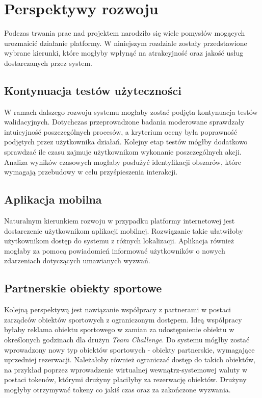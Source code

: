 \chapter{Perspektywy rozwoju}

Podczas trwania prac nad projektem narodziło się wiele pomysłów mogących urozmaicić działanie platformy. W niniejszym rozdziale zostały przedstawione wybrane kierunki, które mogłyby wpłynąć na atrakcyjność oraz jakość usług dostarczanych przez system.

\section{Kontynuacja testów użyteczności}

W ramach dalszego rozwoju systemu mogłaby zostać podjęta kontynuacja testów walidacyjnych. Dotychczas przeprowadzone badania moderowane sprawdzały intuicyjność poszczególnych procesów, a kryterium oceny była poprawność podjętych przez użytkownika działań. Kolejny etap testów mógłby dodatkowo sprawdzać ile czasu zajmuje użytkownikom wykonanie poszczególnych akcji. Analiza wyników czasowych mogłaby posłużyć identyfikacji obszarów, które wymagają przebudowy w celu przyśpieszenia interakcji.


\section{Aplikacja mobilna}

Naturalnym kierunkiem rozwoju w przypadku platformy internetowej jest dostarczenie użytkownikom aplikacji mobilnej. Rozwiązanie takie ułatwiłoby użytkownikom dostęp do systemu z różnych lokalizacji. Aplikacja również mogłaby za pomocą powiadomień informować użytkowników o nowych zdarzeniach dotyczących umawianych wyzwań.

\section{Partnerskie obiekty sportowe}

Kolejną perspektywą jest nawiązanie współpracy z partnerami w postaci zarządców obiektów sportowych z ograniczonym dostępem. Ideą współpracy byłaby reklama obiektu sportowego w zamian za udostępnienie obiektu w określonych godzinach dla drużyn \textit{Team Challenge}. Do systemu mógłby zostać wprowadzony nowy typ obiektów sportowych - obiekty partnerskie, wymagające uprzedniej rezerwacji. Należałoby również ograniczać dostęp do takich obiektów, na przykład poprzez wprowadzenie wirtualnej wewnątrz-systemowej waluty w postaci tokenów, którymi drużyny płaciłyby za rezerwację obiektów. Drużyny mogłyby otrzymywać tokeny co jakiś czas oraz za zakończone wyzwania.

